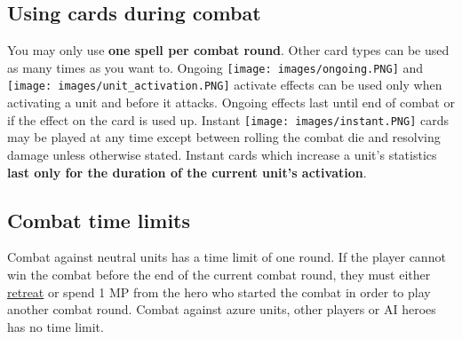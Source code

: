 \documentclass[12pt]{article}
\begin{document}
\subsection*{\hypertarget{CombatCards}{Using cards during combat}}
You may only use \textbf{one spell per combat round}. Other card types can be used as many times as you want to. Ongoing \texttt{[image: images/ongoing.PNG]} and \texttt{[image: images/unit\_activation.PNG]} activate effects can be used only when activating a unit and before it attacks. Ongoing effects last until end of combat or if the effect on the card is used up. Instant \texttt{[image: images/instant.PNG]} cards may be played at any time except between rolling the combat die and resolving damage unless otherwise stated. Instant cards which increase a unit's statistics \textbf{last only for the duration of the current unit's activation}.
\subsection*{\hypertarget{Timelimit}{Combat time limits}}
Combat against neutral units has a time limit of one round. If the player cannot win the combat
before the end of the current combat round, they must either \hyperlink{Endcombat}{retreat} or spend 1 MP from the hero who started the combat in order to play another combat round. Combat against azure units, other players or AI heroes has no time limit.
\clearpage
\end{document}

